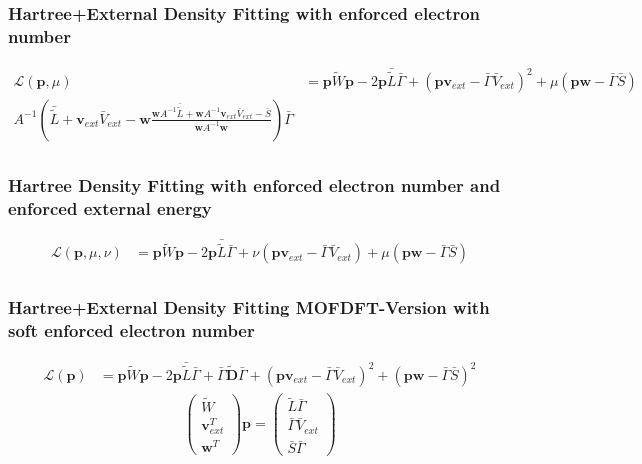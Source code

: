 \subsubsection{Hartree+External Density Fitting with enforced electron number}
\begin{align}
    \mathcal{L}(\mathbf{p},\mu) &= \mathbf{p} \tilde{W} \mathbf{p} - 2 \mathbf{p}\bar {\tilde L} \bar\Gamma + (\mathbf{p}\mathbf{v}_{ext}-\bar\Gamma \bar{V}_{ext})^2+\mu(\mathbf{p}\mathbf{w}-\bar\Gamma\bar S)\\
    A^{-1}\left(\bar {\tilde L} + \mathbf{v}_{ext} \bar{V}_{ext}- \mathbf{w}\frac{\mathbf{w}A^{-1}\bar {\tilde L} +\mathbf{w}A^{-1}\mathbf{v}_{ext} \bar{V}_{ext}-\bar S}{\mathbf{w}A^{-1}\mathbf{w}}\right)\bar\Gamma\\
\end{align}



\subsubsection{Hartree Density Fitting with enforced electron number and enforced external energy}
\begin{align}
    \mathcal{L}(\mathbf{p},\mu,\nu) &= \mathbf{p} \tilde{W} \mathbf{p} - 2 \mathbf{p}\bar {\tilde L} \bar\Gamma + \nu(\mathbf{p}\mathbf{v}_{ext}-\bar\Gamma \bar{V}_{ext})+\mu(\mathbf{p}\mathbf{w}-\bar\Gamma\bar S)\\
\end{align}


\subsubsection{Hartree+External Density Fitting MOFDFT-Version with soft enforced electron number}
\begin{align}
    \mathcal{L}(\mathbf{p}) &= \mathbf{p} \tilde{W} \mathbf{p} - 2 \mathbf{p}\bar {\tilde L} \bar\Gamma + \bar\Gamma \tilde{\mathbf{D}}\bar\Gamma + (\mathbf{p}\mathbf{v}_{ext}-\bar\Gamma \bar{V}_{ext})^2 + (\mathbf{p}\mathbf{w}-\bar\Gamma \bar{S})^2
\end{align}
\begin{align}
    \left(\begin{array}{c}\tilde{W}\\\mathbf{v}_{ext}^T\\\mathbf{w}^T\end{array}\right) \mathbf{p} =  \left(\begin{array}{c}\tilde{L} \bar{\Gamma} \\ \bar{\Gamma}\bar{V}_{ext}\\\bar S\bar \Gamma\end{array}\right)
\end{align}


